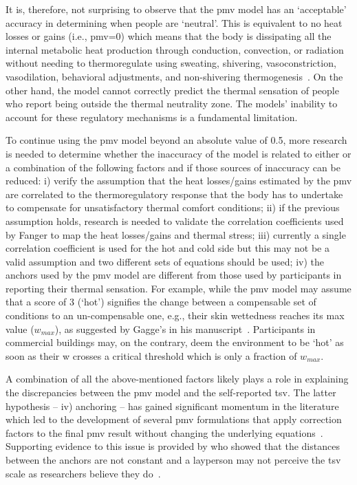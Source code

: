 It is, therefore, not surprising to observe that the \ac{pmv} model has an `acceptable' accuracy in determining when people are `neutral'.
This is equivalent to no heat losses or gains (i.e., \ac{pmv}=0) which means that the body is dissipating all the internal metabolic heat production through conduction, convection, or radiation without needing to thermoregulate using sweating, shivering, vasoconstriction, vasodilation, behavioral adjustments, and non-shivering thermogenesis~\cite{ romanovsky_thermoregulation_2018}.
On the other hand, the model cannot correctly predict the thermal sensation of people who report being outside the thermal neutrality zone.
The models' inability to account for these regulatory mechanisms is a fundamental limitation.

To continue using the \ac{pmv} model beyond an absolute value of \num{0.5}, more research is needed to determine whether the inaccuracy of the model is related to either or a combination of the following factors and if those sources of inaccuracy can be reduced:
i) verify the assumption that the heat losses/gains estimated by the \ac{pmv} are correlated to the thermoregulatory response that the body has to undertake to compensate for unsatisfactory thermal comfort conditions;
ii) if the previous assumption holds, research is needed to validate the correlation coefficients used by Fanger to map the heat losses/gains and thermal stress;
iii) currently a single correlation coefficient is used for the hot and cold side but this may not be a valid assumption and two different sets of  equations should be used;
iv) the anchors used by the \ac{pmv} model are different from those used by participants in reporting their thermal sensation.
For example, while the \ac{pmv} model may assume that a score of 3 (`hot') signifies the change between a compensable set of conditions to an un-compensable one, e.g., their skin wettedness reaches its max value ($w_{max}$), as suggested by Gagge's in his manuscript~\cite{GaggeSET}.
Participants in commercial buildings may, on the contrary, deem the environment to be `hot' as soon as their \ac{w} crosses a critical threshold which is only a fraction of $w_{max}$.

A combination of all the above-mentioned factors likely plays a role in explaining the discrepancies between the \ac{pmv} model and the self-reported \ac{tsv}.
The latter hypothesis -- iv) anchoring -- has gained significant momentum in the literature which led to the development of several \ac{pmv} formulations that apply correction factors to the final \ac{pmv} result without changing the underlying equations~\cite{Yao2022, Toftum2002}.
Supporting evidence to this issue is provided by  who showed that the distances between the anchors are not constant and a layperson may not perceive the \ac{tsv} scale as researchers believe they do~\cite{schweiker2019scales, schweiker2020evaluating}.


